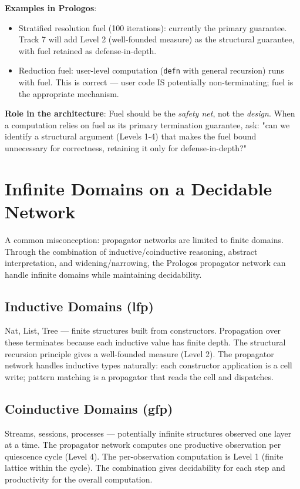 \documentclass[11pt]{article}
\begin{document}
\textbf{Examples in Prologos}:
\begin{itemize}
\item Stratified resolution fuel (100 iterations): currently the primary
guarantee. Track 7 will add Level 2 (well-founded measure) as the
structural guarantee, with fuel retained as defense-in-depth.
\item Reduction fuel: user-level computation (\texttt{defn} with general
recursion) runs with fuel. This is correct --- user code IS
potentially non-terminating; fuel is the appropriate mechanism.
\end{itemize}

\textbf{Role in the architecture}: Fuel should be the \emph{safety net}, not the
\emph{design}. When a computation relies on fuel as its primary termination
guarantee, ask: "can we identify a structural argument (Levels 1-4)
that makes the fuel bound unnecessary for correctness, retaining it
only for defense-in-depth?"
\section{Infinite Domains on a Decidable Network}
\label{sec:org3d10aeb}

A common misconception: propagator networks are limited to finite
domains. Through the combination of inductive/coinductive reasoning,
abstract interpretation, and widening/narrowing, the Prologos
propagator network can handle infinite domains while maintaining
decidability.
\subsection{Inductive Domains (lfp)}
\label{sec:orgc0cdae2}

Nat, List, Tree --- finite structures built from constructors. Propagation
over these terminates because each inductive value has finite depth.
The structural recursion principle gives a well-founded measure
(Level 2). The propagator network handles inductive types naturally:
each constructor application is a cell write; pattern matching is a
propagator that reads the cell and dispatches.
\subsection{Coinductive Domains (gfp)}
\label{sec:org58bcc09}

Streams, sessions, processes --- potentially infinite structures observed
one layer at a time. The propagator network computes one productive
observation per quiescence cycle (Level 4). The per-observation
computation is Level 1 (finite lattice within the cycle). The
combination gives decidability for each step and productivity for the
overall computation.
\end{document}
